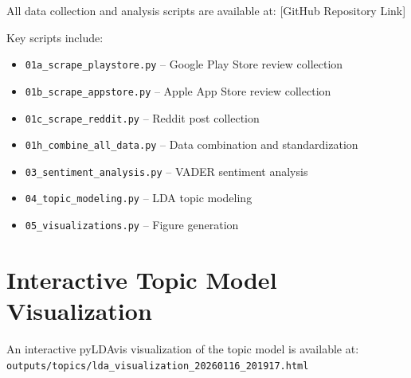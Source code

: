 \documentclass[12pt,a4paper]{article}
\begin{document}
\begin{appendices}
All data collection and analysis scripts are available at: [GitHub Repository Link]

Key scripts include:
\begin{itemize}
    \item \texttt{01a\_scrape\_playstore.py} -- Google Play Store review collection
    \item \texttt{01b\_scrape\_appstore.py} -- Apple App Store review collection
    \item \texttt{01c\_scrape\_reddit.py} -- Reddit post collection
    \item \texttt{01h\_combine\_all\_data.py} -- Data combination and standardization
    \item \texttt{03\_sentiment\_analysis.py} -- VADER sentiment analysis
    \item \texttt{04\_topic\_modeling.py} -- LDA topic modeling
    \item \texttt{05\_visualizations.py} -- Figure generation
\end{itemize}

\section{Interactive Topic Model Visualization}

An interactive pyLDAvis visualization of the topic model is available at: \\
\texttt{outputs/topics/lda\_visualization\_20260116\_201917.html}

\end{appendices}
\end{document}
